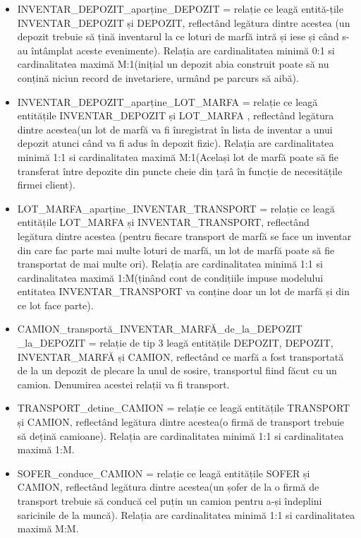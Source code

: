 \documentclass[12pt, a4paper]{article}
\begin{document}
\begin{itemize}
    \item INVENTAR\_DEPOZIT\_aparține\_DEPOZIT = relație ce leagă entită-țile INVENTAR\_DEPOZIT și DEPOZIT, reflectând legătura dintre acestea (un depozit trebuie să țină inventarul la ce loturi de marfă intră și iese și când s-au întâmplat aceste evenimente). Relația are cardinalitatea minimă 0:1 si cardinalitatea maximă M:1(inițial un depozit abia construit poate să nu conțină niciun record de invetariere, urmând pe parcurs să aibă).
    \item INVENTAR\_DEPOZIT\_aparține\_LOT\_MARFA = relație ce leagă entitățile INVENTAR\_DEPOZIT și LOT\_MARFA , reflectând legătura dintre acestea(un lot de marfă va fi înregistrat în lista de inventar a unui depozit atunci când va fi adus în depozit fizic). Relația are cardinalitatea minimă 1:1 si cardinalitatea maximă M:1(Același lot de marfă poate să fie transferat între depozite din puncte cheie din țarâ în funcție de necesitățile firmei client).
    \item LOT\_MARFA\_aparține\_INVENTAR\_TRANSPORT = relație ce leagă entitățile LOT\_MARFA și INVENTAR\_TRANSPORT, reflectând \\legătura dintre acestea (pentru fiecare transport de marfă se face un inventar din care fac parte mai multe loturi de marfă, un lot de marfă poate să fie transportat de mai multe ori). Relația are cardinalitatea minimă 1:1 si cardinalitatea maximă 1:M(ținând cont de condițiile impuse modelului entitatea INVENTAR\_TRANSPORT va conține doar un lot de marfă și din ce lot face parte).
    \item CAMION\_transportă\_INVENTAR\_MARFĂ\_de\_la\_DEPOZIT\\\_la\_DEPOZIT = relație de tip 3 leagă entitățile DEPOZIT, DEPOZIT, INVENTAR\_MARFĂ și CAMION, reflectând ce marfă a fost transportată de la un depozit de plecare la unul de sosire, transportul fiind făcut cu un camion. Denumirea acestei relații va fi transport.
    \item TRANSPORT\_detine\_CAMION = relație ce leagă entitățile TRANSPORT și CAMION, reflectând legătura dintre acestea(o firmă de transport trebuie să dețină camioane). Relația are cardinalitatea minimă 1:1 si cardinalitatea maximă 1:M.
    \item SOFER\_conduce\_CAMION = relație ce leagă entitățile SOFER și \\CAMION, reflectând legătura dintre acestea(un șofer de la o firmă de transport trebuie să conducă cel puțin un camion pentru a-și îndeplini saricinile de la muncă). Relația are cardinalitatea minimă 1:1 si cardinalitatea maximă M:M.

\end{itemize}
\end{document}
